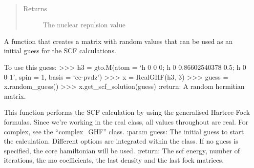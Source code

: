 \documentclass[letterpaper,10pt,english]{sphinxmanual}
\begin{document}
\begin{fulllineitems}
\begin{fulllineitems}
\end{fulllineitems}


\begin{fulllineitems}
\label{\detokenize{real_GHF:ghf.real_GHF.RealGHF.nuc_rep}}~\begin{quote}\begin{description}
\item[{Returns}] \leavevmode
The nuclear repulsion value

\end{description}\end{quote}

\end{fulllineitems}


\begin{fulllineitems}
\label{\detokenize{real_GHF:ghf.real_GHF.RealGHF.random_guess}}
A function that creates a matrix with random values that can be used as an initial guess
for the SCF calculations.

To use this guess:
\textgreater{}\textgreater{}\textgreater{} h3 = gto.M(atom = ‘h 0 0 0; h 0 0.86602540378 0.5; h 0 0 1’, spin = 1, basis = ‘cc-pvdz’)
\textgreater{}\textgreater{}\textgreater{} x = RealGHF(h3, 3)
\textgreater{}\textgreater{}\textgreater{} guess = x.random\_guess()
\textgreater{}\textgreater{}\textgreater{} x.get\_scf\_solution(guess)
:return: A random hermitian matrix.

\end{fulllineitems}


\begin{fulllineitems}
\label{\detokenize{real_GHF:ghf.real_GHF.RealGHF.scf}}
This function performs the SCF calculation by using the generalised Hartree-Fock formulas. Since we’re working
in the real class, all values throughout are real. For complex, see the “complex\_GHF” class.
:param guess: The initial guess to start the calculation. Different options are integrated within the class.
If no guess is specified, the core hamiltonian will be used.
:return: The scf energy, number of iterations, the mo coefficients, the last density and the last fock matrices.


\end{fulllineitems}
\end{fulllineitems}
\end{document}
